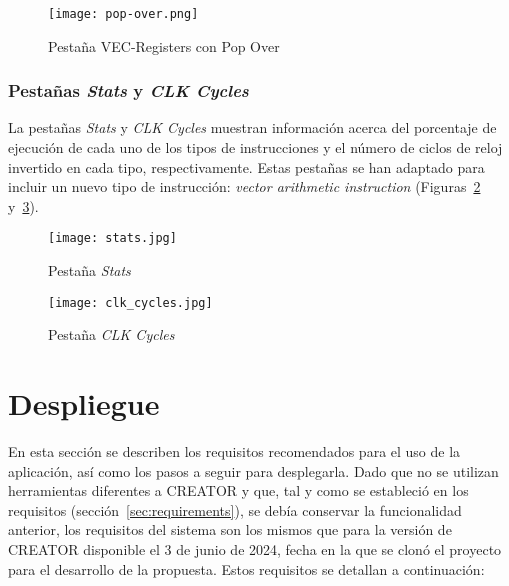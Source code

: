 \begin{figure}[H]

    \texttt{[image: pop-over.png]}
    \caption{Pestaña VEC-Registers con Pop Over}\label{fig:pop-over}
\end{figure}

\subsubsection{Pestañas \textit{Stats} y \textit{CLK Cycles}}

La pestañas \textit{Stats} y \textit{CLK Cycles} muestran información acerca del porcentaje de ejecución de cada uno de los tipos de instrucciones y el número de ciclos de reloj invertido en cada tipo, respectivamente. Estas pestañas se han adaptado para incluir un nuevo tipo de instrucción: \textit{vector arithmetic instruction} (Figuras~\ref{fig:stats-clk} y~\ref{fig:clk}).

\begin{figure}[H]
    {\texttt{[image: stats.jpg]}}
    \caption{Pestaña \textit{Stats}}\label{fig:stats-clk}
\end{figure}

\begin{figure}[H]
    {\texttt{[image: clk\_cycles.jpg]}}
    \caption{Pestaña \textit{CLK Cycles}}\label{fig:clk}
\end{figure}

\section{Despliegue}\label{sec:deploy}

En esta sección se describen los requisitos recomendados para el uso de la aplicación, así como los pasos a seguir para desplegarla. Dado que no se utilizan herramientas diferentes a CREATOR y que, tal y como se estableció en los requisitos (sección~\ref{sec:requirements}), se debía conservar la funcionalidad anterior, los requisitos del sistema son los mismos que para la versión de CREATOR disponible el 3 de junio de 2024, fecha en la que se clonó el proyecto para el desarrollo de la propuesta. Estos requisitos se detallan a continuación:

